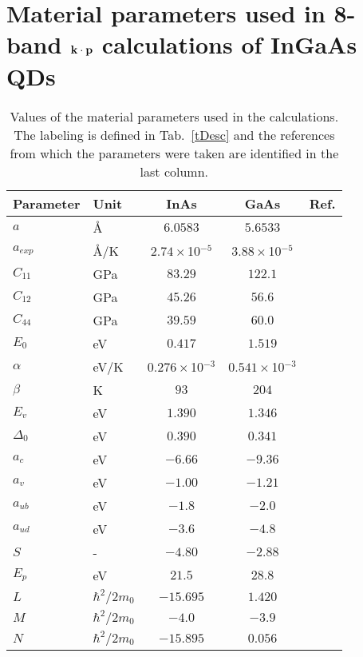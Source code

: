 \chapter{Material parameters used in 8-band $\bf{k \cdot p}$ calculations of InGaAs QDs} \label{app:material_params}

\begin{table*}[!ht]
	\caption{Values of the material parameters used in the calculations. The labeling is defined in Tab.~\ref{tDesc} and the references from which the parameters were taken are identified in the last column.\label{tSb2} 
		}
	\begin{center}
		\begin{tabular}{llccc}
			\hline \hline
			Parameter & Unit & InAs & GaAs & Ref.\\
			\hline
			$a$ & \AA & $6.0583$ & $5.6533$  & \cite{Vurgaftman}\\
			$a_{exp}$ & \AA /K& $2.74\times$10$^{-5}$ & $3.88\times$10$^{-5}$  & \cite{Vurgaftman}\\
			$C_{11}$ & GPa& $83.29$ & $122.1$  & \cite{Vurgaftman}\\
			$C_{12}$ & GPa& $45.26$ & $56.6$  & \cite{Vurgaftman}\\
			$C_{44}$ & GPa& $39.59$ & $60.0$ & \cite{Vurgaftman}\\
			$E_0$ & eV & $0.417$ & $1.519$ &  \cite{Vurgaftman}\\
			$\alpha$ & eV/K & $0.276\times$10$^{-3}$ & $0.541\times$10$^{-3}$ &  \cite{Vurgaftman}\\
			$\beta$ & K & $93$ & $204$ & \cite{Vurgaftman}\\
			$E_v$ & eV & $1.390$ & $1.346$ &  \cite{zunger}\\
			$\Delta_0$ & eV & $0.390$ & $0.341$ &  \cite{Vurgaftman}\\
			$a_c$ & eV & $-6.66$ & $-9.36$ & \cite{zunger}\\
			$a_v$ & eV & $-1.00$ & $-1.21$ & \cite{zunger}\\
			$a_{ub}$ & eV & $-1.8$& $-2.0$&  \cite{Vurgaftman}\\
			$a_{ud}$ & eV & $-3.6$& $-4.8$&  \cite{Vurgaftman}\\
			$S$ & -& $-4.80$ & $-2.88$ & \cite{Vurgaftman}\\
			$E_p$ & eV & $21.5$ & $28.8$ & \cite{Vurgaftman}\\
			$L$ & $\hbar^2/2m_0$ & $-15.695$ & $1.420$ & \cite{Vurgaftman}\\
			$M$ & $\hbar^2/2m_0$ & $-4.0$ & $-3.9$ & \cite{Vurgaftman}\\
			$N$ & $\hbar^2/2m_0$ & $-15.895$ & $0.056$ & \cite{Vurgaftman}\\
			\hline \hline
		\end{tabular}
	\end{center}
\end{table*}

